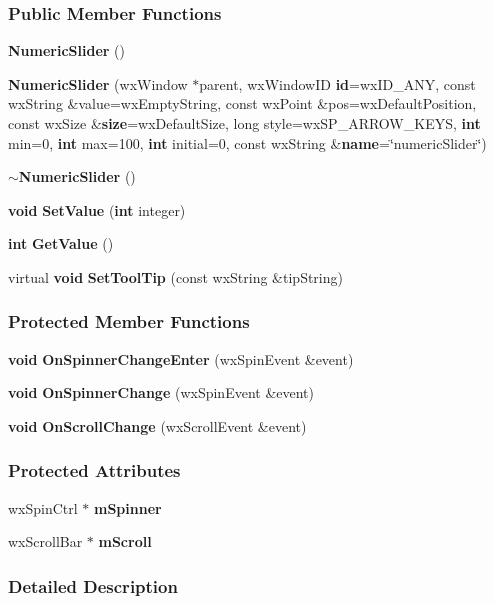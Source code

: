 \subsubsection*{Public Member Functions}
\begin{DoxyCompactItemize}
\item 
{\bf Numeric\+Slider} ()
\item 
{\bf Numeric\+Slider} (wx\+Window $\ast$parent, wx\+Window\+ID {\bf id}=wx\+I\+D\+\_\+\+A\+NY, const wx\+String \&value=wx\+Empty\+String, const wx\+Point \&pos=wx\+Default\+Position, const wx\+Size \&{\bf size}=wx\+Default\+Size, long style=wx\+S\+P\+\_\+\+A\+R\+R\+O\+W\+\_\+\+K\+E\+YS, {\bf int} min=0, {\bf int} max=100, {\bf int} initial=0, const wx\+String \&{\bf name}=\char`\"{}numeric\+Slider\char`\"{})
\item 
{\bf $\sim$\+Numeric\+Slider} ()
\item 
{\bf void} {\bf Set\+Value} ({\bf int} integer)
\item 
{\bf int} {\bf Get\+Value} ()
\item 
virtual {\bf void} {\bf Set\+Tool\+Tip} (const wx\+String \&tip\+String)
\end{DoxyCompactItemize}
\subsubsection*{Protected Member Functions}
\begin{DoxyCompactItemize}
\item 
{\bf void} {\bf On\+Spinner\+Change\+Enter} (wx\+Spin\+Event \&event)
\item 
{\bf void} {\bf On\+Spinner\+Change} (wx\+Spin\+Event \&event)
\item 
{\bf void} {\bf On\+Scroll\+Change} (wx\+Scroll\+Event \&event)
\end{DoxyCompactItemize}
\subsubsection*{Protected Attributes}
\begin{DoxyCompactItemize}
\item 
wx\+Spin\+Ctrl $\ast$ {\bf m\+Spinner}
\item 
wx\+Scroll\+Bar $\ast$ {\bf m\+Scroll}
\end{DoxyCompactItemize}


\subsubsection{Detailed Description}


